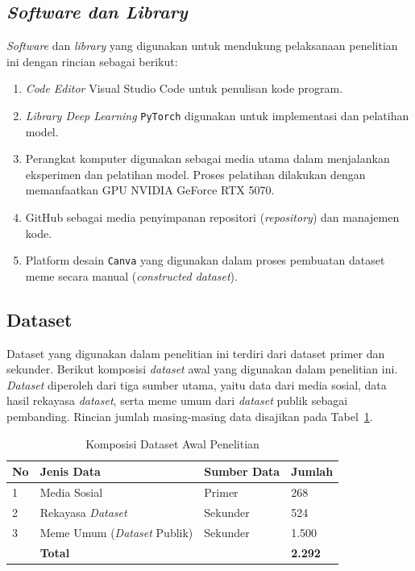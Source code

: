 \subsection{\textit{Software dan Library}} \label{subsec:software_dan_library}
\textit{Software} dan \textit{library} yang digunakan untuk mendukung pelaksanaan penelitian ini dengan rincian sebagai berikut:
\begin{enumerate}[noitemsep]
    \item \textit{Code Editor} Visual Studio Code untuk penulisan kode program.
    \item \textit{Library Deep Learning} \texttt{PyTorch} digunakan untuk implementasi dan pelatihan model.
    \item Perangkat komputer digunakan sebagai media utama dalam menjalankan eksperimen dan pelatihan model. Proses pelatihan dilakukan dengan memanfaatkan GPU NVIDIA GeForce RTX 5070.
    \item GitHub sebagai media penyimpanan repositori (\textit{repository}) dan manajemen kode.
    \item Platform desain \texttt{Canva} yang digunakan dalam proses pembuatan dataset meme secara manual (\textit{constructed dataset}).
\end{enumerate}

\subsection{Dataset} \label{subsec:dataset}
Dataset yang digunakan dalam penelitian ini terdiri dari dataset primer dan sekunder. Berikut komposisi \textit{dataset} awal yang digunakan dalam penelitian ini. \textit{Dataset} diperoleh dari tiga sumber utama, yaitu data  dari media sosial, data hasil rekayasa \textit{dataset}, serta meme umum dari \textit{dataset} publik sebagai pembanding. Rincian jumlah masing-masing data disajikan pada Tabel~\ref{tabel:komposisi_dataset}.

\begin{table}[H]
    \centering
    \caption{Komposisi Dataset Awal Penelitian}
    \label{tabel:komposisi_dataset}
    \small
    \setlength{\tabcolsep}{3pt}
    \renewcommand{\arraystretch}{1.1}
    \begin{tabular}{p{0.6cm} p{3.8cm} p{1.6cm} p{1.4cm}}
        \hline
        \textbf{No} & {\raggedright \textbf{Jenis Data}\par} & \textbf{Sumber Data} & \textbf{Jumlah} \\
        \hline
        1 & {\raggedright Media Sosial\par} & Primer & 268 \\
        2 & {\raggedright Rekayasa \textit{Dataset}\par} & Sekunder & 524 \\
        3 & {\raggedright Meme Umum (\textit{Dataset} Publik)\par} & Sekunder & 1.500 \\
        \hline
        & {\raggedright \textbf{Total}\par} & & \textbf{2.292} \\
        \hline
    \end{tabular}
\end{table}

